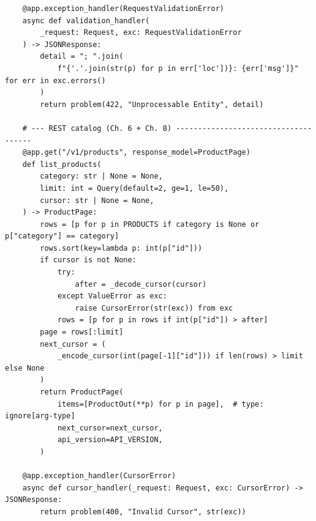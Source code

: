 \begin{verbatim}
    @app.exception_handler(RequestValidationError)
    async def validation_handler(
        _request: Request, exc: RequestValidationError
    ) -> JSONResponse:
        detail = "; ".join(
            f"{'.'.join(str(p) for p in err['loc'])}: {err['msg']}" for err in exc.errors()
        )
        return problem(422, "Unprocessable Entity", detail)

    # --- REST catalog (Ch. 6 + Ch. 8) -------------------------------------
    @app.get("/v1/products", response_model=ProductPage)
    def list_products(
        category: str | None = None,
        limit: int = Query(default=2, ge=1, le=50),
        cursor: str | None = None,
    ) -> ProductPage:
        rows = [p for p in PRODUCTS if category is None or p["category"] == category]
        rows.sort(key=lambda p: int(p["id"]))
        if cursor is not None:
            try:
                after = _decode_cursor(cursor)
            except ValueError as exc:
                raise CursorError(str(exc)) from exc
            rows = [p for p in rows if int(p["id"]) > after]
        page = rows[:limit]
        next_cursor = (
            _encode_cursor(int(page[-1]["id"])) if len(rows) > limit else None
        )
        return ProductPage(
            items=[ProductOut(**p) for p in page],  # type: ignore[arg-type]
            next_cursor=next_cursor,
            api_version=API_VERSION,
        )

    @app.exception_handler(CursorError)
    async def cursor_handler(_request: Request, exc: CursorError) -> JSONResponse:
        return problem(400, "Invalid Cursor", str(exc))


\end{verbatim}
